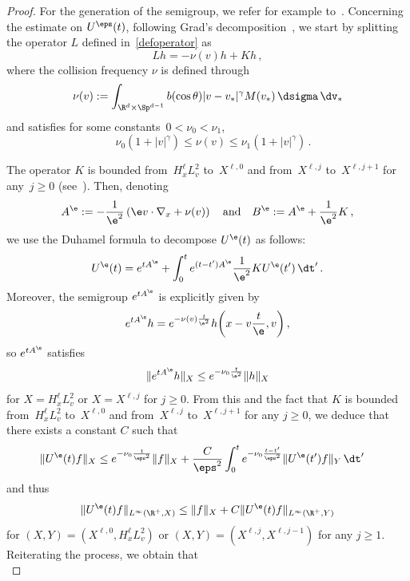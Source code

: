 \begin{proof}
For the generation of the semigroup, we refer for example to~\cite{Glassey, Ukai}. Concerning the estimate on $U^\eps(t)$, following Grad's decomposition~\cite{Grad}, we start by splitting the operator $L$ defined in~\eqref{defoperator} as
\[
L h= -\nu(v) h + Kh \,,
\]
where the collision frequency $\nu$ is defined through \begin{equation}\label{defnu(v)}
\nu(v) := \int_{\R^d \times \Sp^{d-1} } b(\cos \theta) |v-v_*|^\gamma M(v_*)\, \dsigma \, \dv_*
\end{equation}
and satisfies for some constants~$0<\nu_0<\nu_1$,
\[
\quad \nu_0(1+|v|^\gamma) \leq \nu (v) \leq \nu_1(1+|v|^\gamma) \,.
\]

The operator $K$ is bounded from~$H^\ell_x L^2_v$ to~$X^{\ell,0}$ and from~$X^{\ell,j}$ to~$X^{\ell,j+1}$ for any~$j \ge 0$ (see~\cite{Ukai}). Then, denoting
\[
A^\e:=-\frac{1}{\e^2} \left(\e v \cdot \nabla_x + \nu(v)\right) \quad \text{and} \quad B^\e:=A^\e + \frac{1}{\e^2} K\,,
\]
we use the Duhamel formula to decompose $U^\e(t)$ as follows:
\begin{equation}\label{eq:decompUeps}
U^\e(t)=e^{tA^\e} + \int_0^t e^{(t-t')A^\e} \frac{1}{\e^2} K U^\e(t') \, \dt'\,.
\end{equation}
Moreover, the semigroup $e^{tA^\e}$ is explicitly given by
\begin{equation}\label{semigroupAeps}
e^{tA^\e} h = e^{-\nu(v)\frac{t}{\e^2}} h\bigg(x-v\frac{t}{\e},v\bigg)\,,
\end{equation}
so $e^{tA^\e}$ satisfies
\[
\|e^{tA^\e} h\|_X \le e^{-\nu_0\frac{t}{\e^2}} \|h\|_X
\]
for $X=H^\ell_x L^2_v$ or $X=X^{\ell,j}$ for $j \ge 0$. From this and the fact that $K$ is bounded from~$H^\ell_x L^2_v$ to~$X^{\ell,0}$ and from~$X^{\ell,j}$ to~$X^{\ell,j+1}$ for any $j \ge 0$, we deduce that there exists a constant $C$ such that
\begin{align*}
\|U^\e(t)f\|_{X} &\le e^{-\nu_0{\frac{t}{\eps^2}}} \|f\|_X + \frac{C}{\eps^2}\int_0^t e^{-\nu_0 \frac{t-t'}{\eps^2}} \|U^\e(t') f\|_Y \, \dt'
\end{align*}
and thus
\begin{equation}\label{estimateUepsreferee}
\|U^\e(t)f\|_{L^\infty(\R^+,X)}\le \|f\|_X + C \|U^\e(t) f\|_{L^\infty(\R^+,Y)}
\end{equation}
for $(X,Y)=(X^{\ell,0},H^\ell_xL^2_v)$ or $(X,Y)=(X^{\ell,j},X^{\ell,j-1})$ for any $j \ge 1$. Reiterating the process, we obtain that
\begin{equation}\label{reiter}

\end{equation}
\end{proof}
